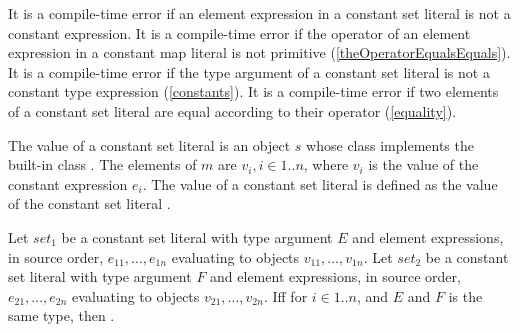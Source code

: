 \documentclass[makeidx]{article}
\begin{document}
{

\LMHash{}%
It is a compile-time error if an element expression in a constant set literal
is not a constant expression.
It is a compile-time error if
the operator \lit{==} of an element expression in a constant map literal
is not primitive
(\ref{theOperatorEqualsEquals}).
It is a compile-time error if the type argument of a constant set literal
is not a constant type expression
(\ref{constants}).
It is a compile-time error if two elements of a constant set literal are equal
according to their \lit{==} operator
(\ref{equality}).

\LMHash{}%
The value of a constant set literal
is an object $s$ whose class implements the built-in class
.
The elements of $m$ are $v_i, i \in 1 .. n$,
where $v_i$ is the value of the constant expression $e_i$.
%
The value of a constant set literal
is defined as the value of the constant set literal
.

\LMHash{}%
Let $set_1$ be a constant set literal with type argument $E$
and element expressions, in source order, $e_{11}, \ldots, e_{1n}$ evaluating
to objects $v_{11}, \ldots, v_{1n}$.
Let $set_2$ be a constant set literal with type argument $F$
and element expressions, in source order, $e_{21}, \ldots, e_{2n}$ evaluating
to objects $v_{21}, \ldots, v_{2n}$.
If{}f 
for $i \in 1 .. n$, and $E$ and $F$ is the same type,
then .


}
\end{document}
